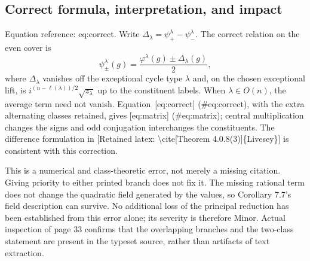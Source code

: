\documentclass[10pt]{article}
\begin{document}
\subsection*{Correct formula, interpretation, and impact}
Equation reference: eq:correct. Write \(\Delta_\lambda=\psi^\lambda_+-\psi^\lambda_-\). The correct relation on the even cover is \[
 \psi^\lambda_\pm(g)=
 \frac{\varphi^\lambda(g)\pm\Delta_\lambda(g)}{2},\] where \(\Delta_\lambda\) vanishes off the exceptional cycle type \(\lambda\) and, on the chosen exceptional lift, is \(i^{(n-\ell(\lambda))/2}\sqrt{z_\lambda}\) up to the constituent labels. When \(\lambda\in O(n)\), the average term need not vanish. Equation [eq:correct] (\#eq:correct), with the extra alternating classes retained, gives [eq:matrix] (\#eq:matrix); central multiplication changes the signs and odd conjugation interchanges the constituents. The difference formulation in [Retained latex: \textbackslash{}cite[Theorem 4.0.8(3)]\{Livesey\}] is consistent with this correction.\par
This is a numerical and class-theoretic error, not merely a missing citation. Giving priority to either printed branch does not fix it. The missing rational term does not change the quadratic field generated by the values, so Corollary 7.7’s field description can survive. No additional loss of the principal reduction has been established from this error alone; its severity is therefore Minor. Actual inspection of page 33 confirms that the overlapping branches and the two-class statement are present in the typeset source, rather than artifacts of text extraction.\par
\end{document}
